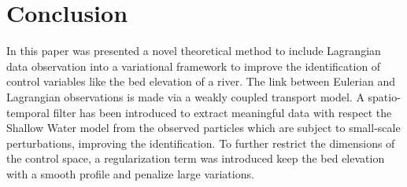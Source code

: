 \section{Conclusion}

In this paper was presented a novel theoretical method to include Lagrangian data observation into a variational framework to improve the identification of control variables like the bed elevation of a river. The link between Eulerian and Lagrangian observations is made via a weakly coupled transport model. A spatio-temporal filter has been introduced to extract meaningful data with respect the Shallow Water model from the observed particles which are subject to small-scale perturbations, improving the identification. To further restrict the dimensions of the control space, a regularization term was introduced keep the bed elevation with a smooth profile and penalize large variations. 






 
 
 
 
 
 
 
 
 
 
 
 
 
